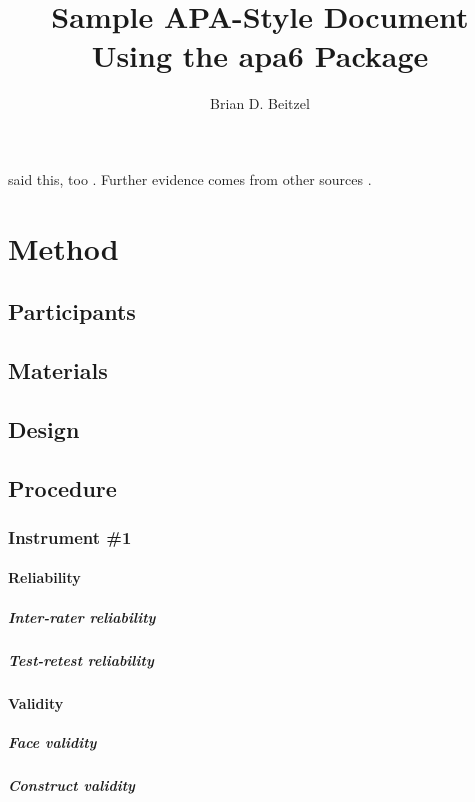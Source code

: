 \documentclass[man]{apa6}
\title{Sample APA-Style Document Using the \textsf{apa6} Package}
\author{Brian D. Beitzel}
\affiliation{SUNY Oneonta}
\begin{document}
\maketitle
\lipsum[2]

\Textcite{vonDavier2011} said this,
too \parencite{vonDavier2011,Lassen2006}.  Further evidence comes from
other sources \parencite{Shotton1989,Lassen2006}.  \lipsum[3]

\section{Method}
\subsection{Participants}
\lipsum[4]

\subsection{Materials}
\lipsum[5]

\subsection{Design}
\lipsum[6]

\subsection{Procedure}
\lipsum[7]

\subsubsection{Instrument \#1}
\lipsum[8]

\paragraph{Reliability}
\lipsum[9]

\subparagraph{Inter-rater reliability}
\lipsum[10]

\subparagraph{Test-retest reliability}
\lipsum[11]

\paragraph{Validity}
\lipsum[12]

\subparagraph{Face validity}
\lipsum[13]

\subparagraph{Construct validity}
\lipsum[14]
\end{document}
